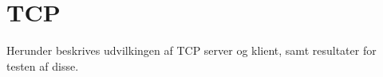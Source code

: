 \chapter{TCP}
Herunder beskrives udvilkingen af TCP server og klient, samt resultater for testen af disse.

